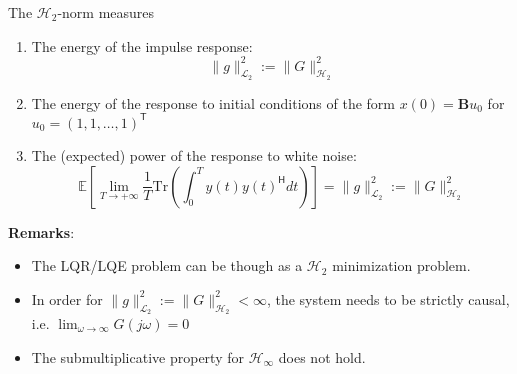 The $\mathcal{H}_2$-norm measures
\begin{enumerate}
    \item The energy of the impulse response:
          \noindent\begin{equation*}
              \|g\|_{\mathcal{L}_2}^2:= \|G\|_{\mathcal{H}_2}^2
          \end{equation*}
    \item The energy of the response to initial conditions of the form $x(0)=\mathbf{B}u_0$ for $u_0={(1,1,\ldots, 1)}^{\mathsf{T}}$
    \item The (expected) power of the response to white noise:
          \noindent\begin{equation*}
              \mathbb{E}\left[\lim_{T\to+\infty}\frac{1}{T}\text{Tr}\left(\int_0^T y(t){y(t)}^{\mathsf{H}} dt\right)\right] =  \|g\|_{\mathcal{L}_2}^2:= \|G\|_{\mathcal{H}_2}^2
          \end{equation*}
\end{enumerate}
\textbf{Remarks}:
\begin{itemize}
    \item The LQR/LQE problem can be though as a $\mathcal{H}_2$ minimization problem.
    \item In order for $\|g\|_{\mathcal{L}_2}^2:= \|G\|_{\mathcal{H}_2}^2<\infty$, the system needs to be strictly causal, i.e. $\lim_{\omega\to\infty}G(j\omega)=0$
    \item The submultiplicative property for $\mathcal{H}_\infty$ does not hold.
\end{itemize}